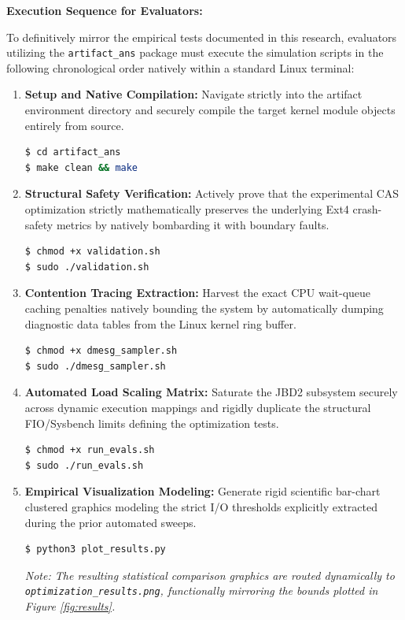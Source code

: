 \begin{itemize}
    \vspace{0.5cm}
\noindent\textbf{Execution Sequence for Evaluators:}

To definitively mirror the empirical tests documented in this research, evaluators utilizing the \texttt{artifact\_ans} package must execute the simulation scripts in the following chronological order natively within a standard Linux terminal:

\begin{enumerate}
    \item \textbf{Setup and Native Compilation:} Navigate strictly into the artifact environment directory and securely compile the target kernel module objects entirely from source.
    \begin{lstlisting}[language=bash]
$ cd artifact_ans
$ make clean && make
    \end{lstlisting}

    \item \textbf{Structural Safety Verification:} Actively prove that the experimental CAS optimization strictly mathematically preserves the underlying Ext4 crash-safety metrics by natively bombarding it with boundary faults.
    \begin{lstlisting}[language=bash]
$ chmod +x validation.sh
$ sudo ./validation.sh
    \end{lstlisting}
    
    \item \textbf{Contention Tracing Extraction:} Harvest the exact CPU wait-queue caching penalties natively bounding the system by automatically dumping diagnostic data tables from the Linux kernel ring buffer.
    \begin{lstlisting}[language=bash]
$ chmod +x dmesg_sampler.sh
$ sudo ./dmesg_sampler.sh
    \end{lstlisting}

    \item \textbf{Automated Load Scaling Matrix:} Saturate the JBD2 subsystem securely across dynamic execution mappings and rigidly duplicate the structural FIO/Sysbench limits defining the optimization tests.
    \begin{lstlisting}[language=bash]
$ chmod +x run_evals.sh
$ sudo ./run_evals.sh
    \end{lstlisting}

    \item \textbf{Empirical Visualization Modeling:} Generate rigid scientific bar-chart clustered graphics modeling the strict I/O thresholds explicitly extracted during the prior automated sweeps.
    \begin{lstlisting}[language=bash]
$ python3 plot_results.py
    \end{lstlisting}
    \textit{Note: The resulting statistical comparison graphics are routed dynamically to \texttt{optimization\_results.png}, functionally mirroring the bounds plotted in Figure \ref{fig:results}.}
\end{enumerate}

\end{itemize}


